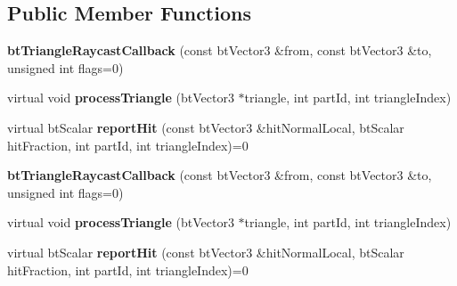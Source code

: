 \subsection*{Public Member Functions}
\begin{DoxyCompactItemize}
\item 
\mbox{\label{classbtTriangleRaycastCallback_acfd6e50b725eedde2c5054d877a679fc}} 
{\bfseries bt\+Triangle\+Raycast\+Callback} (const bt\+Vector3 \&from, const bt\+Vector3 \&to, unsigned int flags=0)
\item 
\mbox{\label{classbtTriangleRaycastCallback_abfa22cc0d4b842c1ad9566154f450f1d}} 
virtual void {\bfseries process\+Triangle} (bt\+Vector3 $\ast$triangle, int part\+Id, int triangle\+Index)
\item 
\mbox{\label{classbtTriangleRaycastCallback_ae586790c742393f3650261de3a87f738}} 
virtual bt\+Scalar {\bfseries report\+Hit} (const bt\+Vector3 \&hit\+Normal\+Local, bt\+Scalar hit\+Fraction, int part\+Id, int triangle\+Index)=0
\item 
\mbox{\label{classbtTriangleRaycastCallback_acfd6e50b725eedde2c5054d877a679fc}} 
{\bfseries bt\+Triangle\+Raycast\+Callback} (const bt\+Vector3 \&from, const bt\+Vector3 \&to, unsigned int flags=0)
\item 
\mbox{\label{classbtTriangleRaycastCallback_ac62c7078c1e471ec5d0d98c6668eb533}} 
virtual void {\bfseries process\+Triangle} (bt\+Vector3 $\ast$triangle, int part\+Id, int triangle\+Index)
\item 
\mbox{\label{classbtTriangleRaycastCallback_ae586790c742393f3650261de3a87f738}} 
virtual bt\+Scalar {\bfseries report\+Hit} (const bt\+Vector3 \&hit\+Normal\+Local, bt\+Scalar hit\+Fraction, int part\+Id, int triangle\+Index)=0
\end{DoxyCompactItemize}

